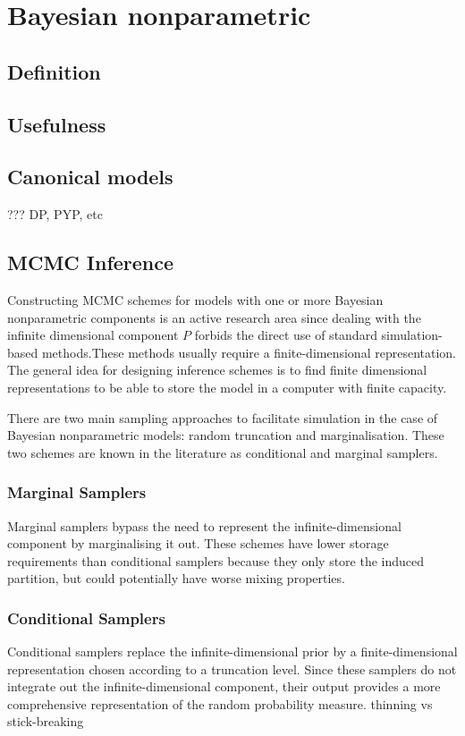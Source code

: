 \section{Bayesian nonparametric}

\subsection{Definition} \label{BNP_def}

\subsection{Usefulness}

\subsection{Canonical models}
???
DP, PYP, etc

\subsection{MCMC Inference}

\quad Constructing MCMC schemes for models with one or more Bayesian nonparametric components is an active research area since dealing with the infinite dimensional component $P$ forbids the direct use of standard simulation-based methods.These methods usually require a finite-dimensional representation. The general idea for designing inference schemes is to find finite dimensional representations to be able to store the model in a computer with finite capacity.

There are two main sampling approaches to facilitate simulation in the case of Bayesian nonparametric models: random truncation and marginalisation. These two schemes are known in the literature as conditional and marginal samplers.

\subsubsection{Marginal Samplers}
\quad Marginal samplers bypass the need to represent the infinite-dimensional component by marginalising it out. These schemes have lower storage requirements than conditional samplers because they only store the induced partition, but could potentially have worse mixing properties.

\subsubsection{Conditional Samplers}
\quad Conditional samplers replace the infinite-dimensional prior by a finite-dimensional representation chosen according to a truncation level. Since these samplers do not integrate out the infinite-dimensional component, their output provides a more comprehensive representation of the random probability measure.
thinning vs stick-breaking

